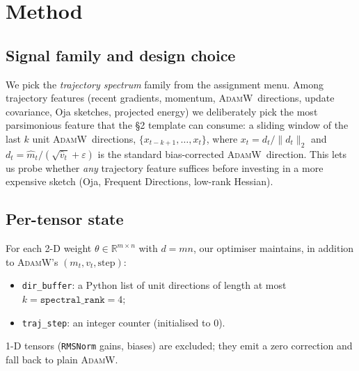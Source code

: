 \documentclass{article}
\newcommand{\Adamw}{\textsc{AdamW}}
\begin{document}
\section{Method}

\subsection{Signal family and design choice}
We pick the \emph{trajectory spectrum} family from the assignment
menu.  Among trajectory features (recent gradients, momentum, \Adamw\
directions, update covariance, Oja sketches, projected energy) we
deliberately pick the most parsimonious feature that the §2 template
can consume: a sliding window of the last $k$ unit \Adamw\
directions, $\{x_{t-k+1},\dots,x_t\}$, where $x_t = d_t/\|d_t\|_2$
and $d_t = \hat m_t/(\sqrt{\hat v_t}+\varepsilon)$ is the standard
bias-corrected \Adamw\ direction.  This lets us probe whether
\emph{any} trajectory feature suffices before investing in a more
expensive sketch (Oja, Frequent Directions, low-rank Hessian).

\subsection{Per-tensor state}
For each 2-D weight $\theta \in \mathbb{R}^{m\times n}$ with
$d = mn$, our optimiser maintains, in addition to \Adamw's
$(m_t, v_t, \text{step})$:
\begin{itemize}
  \item \texttt{dir\_buffer}: a Python list of unit directions of
        length at most $k = \texttt{spectral\_rank} = 4$;
  \item \texttt{traj\_step}: an integer counter (initialised to $0$).
\end{itemize}
1-D tensors (\texttt{RMSNorm} gains, biases) are excluded; they emit
a zero correction and fall back to plain \Adamw.
\end{document}
